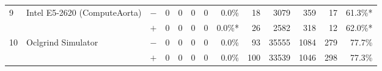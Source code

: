 \begin{tabular}{lll | rrrrr | rrrrr }
\hline
\multirow{ 2}{*}{9} & \multirow{ 2}{*}{Intel E5-2620 (ComputeAorta)} & $-$ & 0 & 0 & 0 & 0 & 0.0\%       & 18 & 3079 & 359 & 17 & 61.3\%* \\& & $+$ & 0 & 0 & 0 & 0 & 0.0\%* & 26 & 2582 & 318 & 12 & 62.0\%* \\
\hline
\multirow{ 2}{*}{10} & \multirow{ 2}{*}{Oclgrind Simulator} & $-$ & 0 & 0 & 0 & 0 & 0.0\%       & 93 & 35555 & 1084 & 279 & 77.7\% \\& & $+$ & 0 & 0 & 0 & 0 & 0.0\% & 100 & 33539 & 1046 & 298 & 77.3\% \\
  \bottomrule
\end{tabular}

